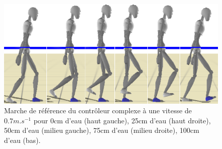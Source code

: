 \documentclass[runningheads,a4paper]{llncs}
\begin{document}
\begin{figure}[!h]
\includegraphics[scale=0.3]{strips/3_6_1_100cm.png}
\caption{Marche de référence du contrôleur complexe à une vitesse de $0.7m.s^{-1}$ pour 0cm d'eau (haut gauche), 25cm d'eau (haut droite), 50cm d'eau (milieu gauche), 75cm d'eau (milieu droite), 100cm d'eau (bas). }
\label{fig:ref_mouv_03}
\end{figure}


\newpage
\end{document}
